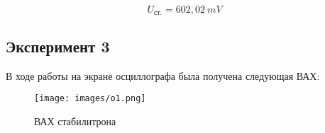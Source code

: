 \documentclass[12pt]{article}
\begin{document}
    $$ U_{\text{ст.}} = 602,02\ mV $$

    \subsection*{Эксперимент 3}

    В ходе работы на экране осциллографа была получена следующая ВАХ:

    \begin{figure}[ht]
        \centering
        \texttt{[image: images/o1.png]}
        \caption{ВАХ стабилитрона}
        \label{fig:o:1}
    \end{figure}
\end{document}
